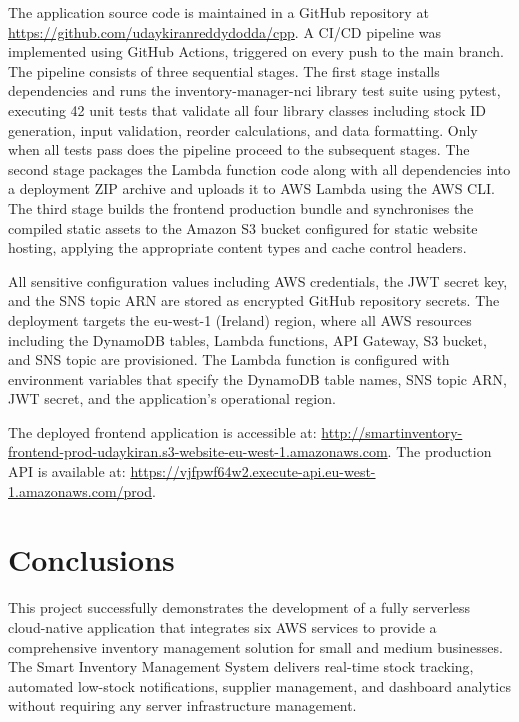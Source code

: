\documentclass[conference]{IEEEtran}
\begin{document}
The application source code is maintained in a GitHub repository at \url{https://github.com/udaykiranreddydodda/cpp}. A CI/CD pipeline was implemented using GitHub Actions, triggered on every push to the main branch. The pipeline consists of three sequential stages. The first stage installs dependencies and runs the inventory-manager-nci library test suite using pytest, executing 42 unit tests that validate all four library classes including stock ID generation, input validation, reorder calculations, and data formatting. Only when all tests pass does the pipeline proceed to the subsequent stages. The second stage packages the Lambda function code along with all dependencies into a deployment ZIP archive and uploads it to AWS Lambda using the AWS CLI. The third stage builds the frontend production bundle and synchronises the compiled static assets to the Amazon S3 bucket configured for static website hosting, applying the appropriate content types and cache control headers.

All sensitive configuration values including AWS credentials, the JWT secret key, and the SNS topic ARN are stored as encrypted GitHub repository secrets. The deployment targets the eu-west-1 (Ireland) region, where all AWS resources including the DynamoDB tables, Lambda functions, API Gateway, S3 bucket, and SNS topic are provisioned. The Lambda function is configured with environment variables that specify the DynamoDB table names, SNS topic ARN, JWT secret, and the application's operational region.

The deployed frontend application is accessible at: \url{http://smartinventory-frontend-prod-udaykiran.s3-website-eu-west-1.amazonaws.com}. The production API is available at: \url{https://vjfpwf64w2.execute-api.eu-west-1.amazonaws.com/prod}.

\section{Conclusions}

This project successfully demonstrates the development of a fully serverless cloud-native application that integrates six AWS services to provide a comprehensive inventory management solution for small and medium businesses. The Smart Inventory Management System delivers real-time stock tracking, automated low-stock notifications, supplier management, and dashboard analytics without requiring any server infrastructure management.
\end{document}
